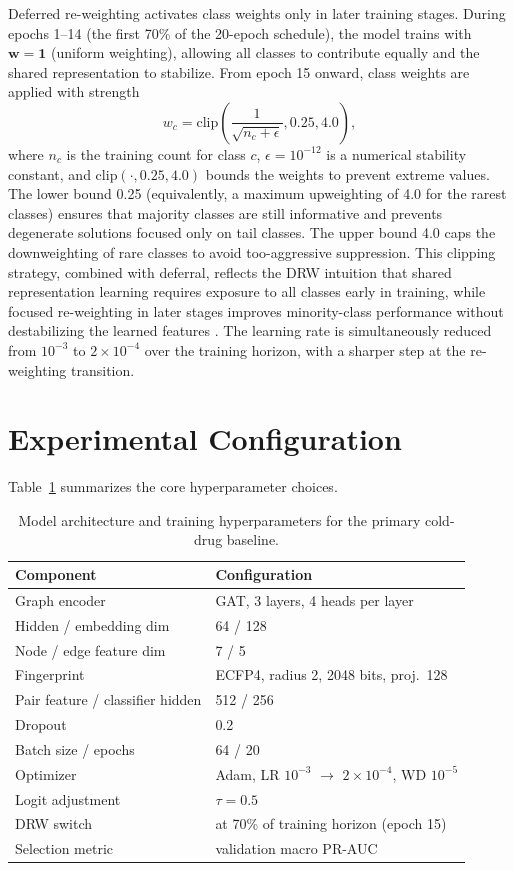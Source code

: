 \documentclass[11pt,a4paper]{report}
\begin{document}
Deferred re-weighting activates class weights only in later training stages. During epochs 1--14 (the first 70\% of the 20-epoch schedule), the model trains with \(\mathbf{w} = \mathbf{1}\) (uniform weighting), allowing all classes to contribute equally and the shared representation to stabilize. From epoch 15 onward, class weights are applied with strength
\begin{equation}
w_c = \mathrm{clip}\left(\frac{1}{\sqrt{n_c + \epsilon}}, 0.25, 4.0 \right),
\end{equation}
where \(n_c\) is the training count for class \(c\), \(\epsilon = 10^{-12}\) is a numerical stability constant, and \(\mathrm{clip}(\cdot, 0.25, 4.0)\) bounds the weights to prevent extreme values. The lower bound 0.25 (equivalently, a maximum upweighting of 4.0 for the rarest classes) ensures that majority classes are still informative and prevents degenerate solutions focused only on tail classes. The upper bound 4.0 caps the downweighting of rare classes to avoid too-aggressive suppression. This clipping strategy, combined with deferral, reflects the DRW intuition that shared representation learning requires exposure to all classes early in training, while focused re-weighting in later stages improves minority-class performance without destabilizing the learned features \cite{cao2019ldam}. The learning rate is simultaneously reduced from \(10^{-3}\) to \(2 \times 10^{-4}\) over the training horizon, with a sharper step at the re-weighting transition.
\section{Experimental Configuration}
Table~\ref{tab:hyperparams} summarizes the core hyperparameter choices.
\begin{table}[H]
\centering
\caption{Model architecture and training hyperparameters for the primary cold-drug baseline.}
\label{tab:hyperparams}
\begin{tabular}{ll}
\toprule
Component & Configuration \\
\midrule
Graph encoder & GAT, 3 layers, 4 heads per layer \\
Hidden / embedding dim & 64 / 128 \\
Node / edge feature dim & 7 / 5 \\
Fingerprint & ECFP4, radius 2, 2048 bits, proj.\ 128 \\
Pair feature / classifier hidden & 512 / 256 \\
Dropout & 0.2 \\
Batch size / epochs & 64 / 20 \\
Optimizer & Adam, LR $10^{-3}$ $\to$ $2\!\times\!10^{-4}$, WD $10^{-5}$ \\
Logit adjustment & $\tau = 0.5$ \\
DRW switch & at 70\% of training horizon (epoch 15) \\
Selection metric & validation macro PR-AUC \\
\bottomrule
\end{tabular}
\end{table}
\end{document}
